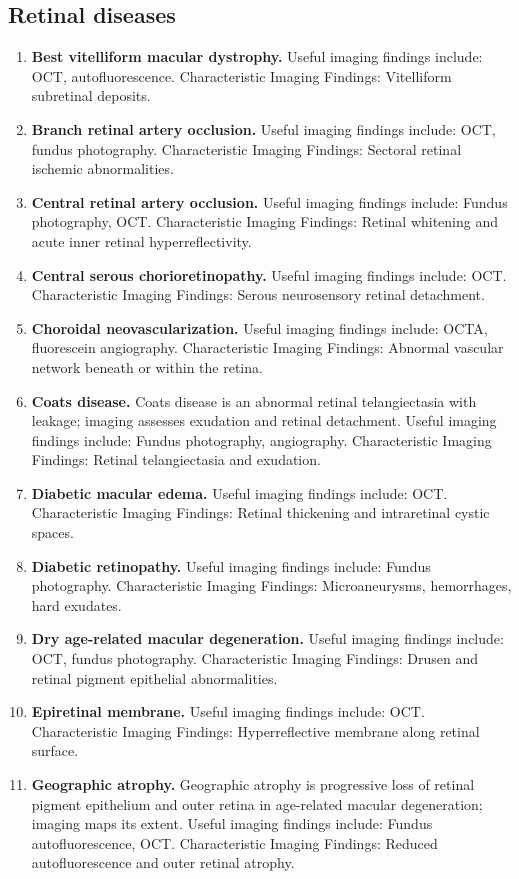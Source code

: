\subsection{Retinal diseases}
\begin{enumerate}[leftmargin=*,itemsep=0.45em,topsep=0.4em]
\item \textbf{Best vitelliform macular dystrophy.} Useful imaging findings include: OCT, autofluorescence. Characteristic Imaging Findings: Vitelliform subretinal deposits.
\item \textbf{Branch retinal artery occlusion.} Useful imaging findings include: OCT, fundus photography. Characteristic Imaging Findings: Sectoral retinal ischemic abnormalities.
\item \textbf{Central retinal artery occlusion.} Useful imaging findings include: Fundus photography, OCT. Characteristic Imaging Findings: Retinal whitening and acute inner retinal hyperreflectivity.
\item \textbf{Central serous chorioretinopathy.} Useful imaging findings include: OCT. Characteristic Imaging Findings: Serous neurosensory retinal detachment.
\item \textbf{Choroidal neovascularization.} Useful imaging findings include: OCTA, fluorescein angiography. Characteristic Imaging Findings: Abnormal vascular network beneath or within the retina.
\item \textbf{Coats disease.} Coats disease is an abnormal retinal telangiectasia with leakage; imaging assesses exudation and retinal detachment. Useful imaging findings include: Fundus photography, angiography. Characteristic Imaging Findings: Retinal telangiectasia and exudation.
\item \textbf{Diabetic macular edema.} Useful imaging findings include: OCT. Characteristic Imaging Findings: Retinal thickening and intraretinal cystic spaces.
\item \textbf{Diabetic retinopathy.} Useful imaging findings include: Fundus photography. Characteristic Imaging Findings: Microaneurysms, hemorrhages, hard exudates.
\item \textbf{Dry age-related macular degeneration.} Useful imaging findings include: OCT, fundus photography. Characteristic Imaging Findings: Drusen and retinal pigment epithelial abnormalities.
\item \textbf{Epiretinal membrane.} Useful imaging findings include: OCT. Characteristic Imaging Findings: Hyperreflective membrane along retinal surface.
\item \textbf{Geographic atrophy.} Geographic atrophy is progressive loss of retinal pigment epithelium and outer retina in age-related macular degeneration; imaging maps its extent. Useful imaging findings include: Fundus autofluorescence, OCT. Characteristic Imaging Findings: Reduced autofluorescence and outer retinal atrophy.

\end{enumerate}
